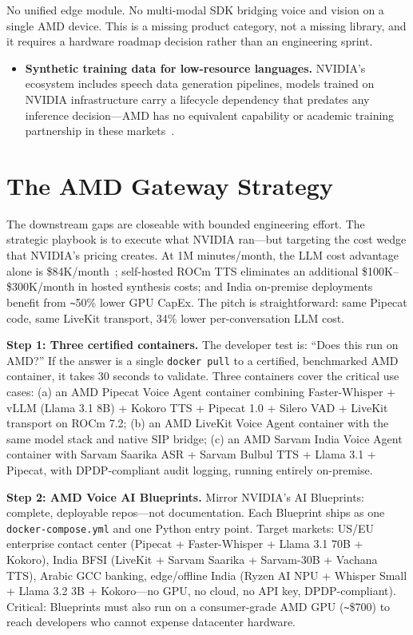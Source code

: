 \documentclass[blind]{gtac}
\begin{document}
No unified edge module. No multi-modal SDK bridging voice and vision on a single AMD device. This is a missing product category, not a missing library, and it requires a hardware roadmap decision rather than an engineering sprint.

\begin{itemize}
  \item \textbf{Synthetic training data for low-resource languages.} NVIDIA's ecosystem includes speech data generation pipelines, models trained on NVIDIA infrastructure carry a lifecycle dependency that predates any inference decision---AMD has no equivalent capability or academic training partnership in these markets~\cite{indic_asr,sarvam_asr}.
\end{itemize}

\section{The AMD Gateway Strategy}
\label{sec:gateway}

The downstream gaps are closeable with bounded engineering effort. The strategic playbook is to execute what NVIDIA ran---but targeting the cost wedge that NVIDIA's pricing creates. At 1M minutes/month, the LLM cost advantage alone is \$84K/month~\cite{spheron_rocm,vllm_rocm}; self-hosted ROCm TTS eliminates an additional \$100K--\$300K/month in hosted synthesis costs; and India on-premise deployments benefit from \texttt{\textasciitilde}50\% lower GPU CapEx. The pitch is straightforward: same Pipecat code, same LiveKit transport, 34\% lower per-conversation LLM cost.

\textbf{Step 1: Three certified containers.}
The developer test is: ``Does this run on AMD?'' If the answer is a single \texttt{docker pull} to a certified, benchmarked AMD container, it takes 30 seconds to validate. Three containers cover the critical use cases: (a) an AMD Pipecat Voice Agent container combining Faster-Whisper + vLLM (Llama 3.1 8B) + Kokoro TTS + Pipecat 1.0 + Silero VAD + LiveKit transport on ROCm 7.2; (b) an AMD LiveKit Voice Agent container with the same model stack and native SIP bridge; (c) an AMD Sarvam India Voice Agent container with Sarvam Saarika ASR + Sarvam Bulbul TTS + Llama 3.1 + Pipecat, with DPDP-compliant audit logging, running entirely on-premise.

\textbf{Step 2: AMD Voice AI Blueprints.}
Mirror NVIDIA's AI Blueprints: complete, deployable repos---not documentation. Each Blueprint ships as one \texttt{docker-compose.yml} and one Python entry point. Target markets: US/EU enterprise contact center (Pipecat + Faster-Whisper + Llama 3.1 70B + Kokoro), India BFSI (LiveKit + Sarvam Saarika + Sarvam-30B + Vachana TTS), Arabic GCC banking, edge/offline India (Ryzen AI NPU + Whisper Small + Llama 3.2 3B + Kokoro---no GPU, no cloud, no API key, DPDP-compliant). Critical: Blueprints must also run on a consumer-grade AMD GPU (\texttt{\textasciitilde}\$700) to reach developers who cannot expense datacenter hardware.
\end{document}
